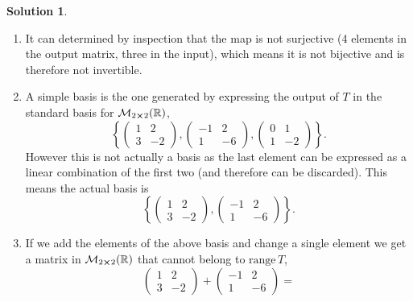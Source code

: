 \documentclass[10pt]{article}
\theoremstyle{definition}
\newtheorem{soln}{Solution}
\begin{document}
\begin{soln}~
  \begin{enumerate}[label=(\alph*)]
    \item It can determined by inspection that the map is not surjective (4 elements in the output matrix, three in the input), which means it is not bijective and is
          therefore not invertible.
    \item A simple basis is the one generated by expressing the output of $T$ in the standard basis for $\mathcal{M}_{2\cross 2}(\mathbb{R})$,
          $$
            \left\{
            \begin{pmatrix}
              1 & 2  \\
              3 & -2
            \end{pmatrix},
            \begin{pmatrix}
              -1 & 2  \\
              1  & -6
            \end{pmatrix},
            \begin{pmatrix}
              0 & 1  \\
              1 & -2
            \end{pmatrix}
            \right\}.
          $$
          However this is not actually a basis as the last element can be expressed as a linear combination of the first two (and therefore can be discarded).
          This means the actual basis is
          $$
            \left\{
            \begin{pmatrix}
              1 & 2  \\
              3 & -2
            \end{pmatrix},
            \begin{pmatrix}
              -1 & 2  \\
              1  & -6
            \end{pmatrix}
            \right\}.
          $$
    \item If we add the elements of the above basis and change a single element we get a matrix in $\mathcal{M}_{2\cross 2}(\mathbb{R})$ that cannot belong to
          $\text{range}\,T$,
          $$\begin{pmatrix}
              1 & 2  \\
              3 & -2
            \end{pmatrix}+
            \begin{pmatrix}
              -1 & 2  \\
              1  & -6
            \end{pmatrix}=
$$
\end{enumerate}
\end{soln}
\end{document}
